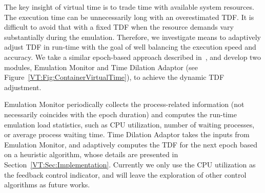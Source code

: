 The key insight of virtual time is to trade time with available system resources.
The execution time can be unnecessarily long with an overestimated TDF. 
It is difficult to avoid that with a fixed TDF when the resource demands vary substantially during the emulation. 
Therefore, we investigate means to adaptively adjust TDF in run-time with the goal of well balancing the execution speed and accuracy. 
We take a similar epoch-based approach described in~\cite{NtwkEmultAdaptVirtTime}, and develop two modules,
Emulation Monitor and Time Dilation Adaptor (see Figure~\ref{VT:Fig:ContainerVirtualTime}), to achieve the dynamic TDF adjustment. 

Emulation Monitor periodically collects the process-related information (not necessarily coincides with the epoch duration)
and computes the run-time emulation load statistics, such as CPU utilization, number of waiting processes, or average process waiting time. 
Time Dilation Adaptor takes the inputs from Emulation Monitor, and adaptively computes the TDF for the next epoch based on a heuristic algorithm,
whose details are presented in Section~\ref{VT:Sec:Implementation}. 
Currently we only use the CPU utilization as the feedback control indicator, and will leave the exploration of other control algorithms as future works. 

